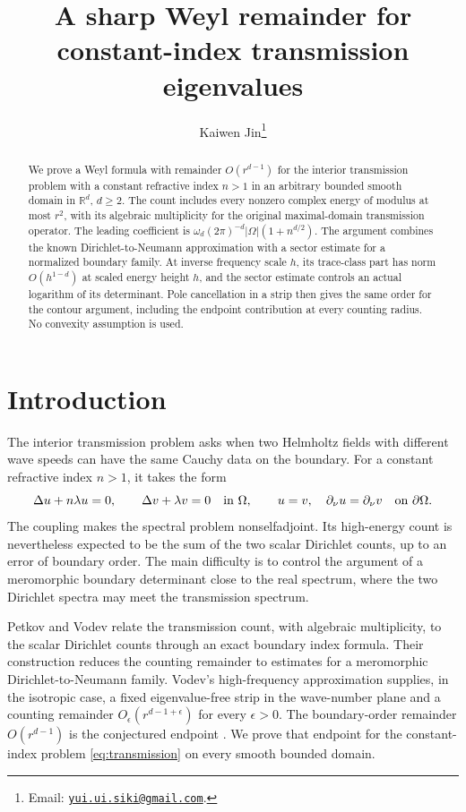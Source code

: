 \documentclass[11pt,a4paper]{article}
\title{A sharp Weyl remainder for constant-index transmission eigenvalues}
\author{Kaiwen Jin\thanks{Email: \href{mailto:yui.ui.siki@gmail.com}{\texttt{yui.ui.siki@gmail.com}}.}}
\date{}
\theoremstyle{remark}
\numberwithin{equation}{section}
\begin{document}
\maketitle
\begin{abstract}
We prove a Weyl formula with remainder $O(r^{d-1})$ for the interior
transmission problem with a constant refractive index $n>1$ in an arbitrary
bounded smooth domain in $\mathbb R^d$, $d\ge2$. The count includes every
nonzero complex energy of modulus at most $r^2$, with its algebraic
multiplicity for the original maximal-domain transmission operator.
The leading coefficient is
$\omega_d(2\pi)^{-d}|\Omega|(1+n^{d/2})$.
The argument combines the known Dirichlet-to-Neumann approximation with a
sector estimate for a normalized boundary family. At inverse frequency scale $h$, its trace-class part
has norm $O(h^{1-d})$ at scaled energy height $h$, and the sector estimate controls an
actual logarithm of its determinant. Pole cancellation in a strip then
gives the same order for the contour argument, including the endpoint
contribution at every counting radius. No convexity assumption is used.
\end{abstract}

\section{Introduction}

The interior transmission problem asks when two Helmholtz fields with
different wave speeds can have the same Cauchy data on the boundary.
For a constant refractive index $n>1$, it takes the form
\begin{equation}\label{eq:transmission}
 \Delta u+n\lambda u=0,\qquad \Delta v+\lambda v=0
 \quad\hbox{in }\Omega,\qquad
 u=v,\quad \partial_\nu u=\partial_\nu v
 \quad\hbox{on }\partial\Omega.
\end{equation}
The coupling makes the spectral problem nonselfadjoint. Its high-energy
count is nevertheless expected to be the sum of the two scalar
Dirichlet counts, up to an error of boundary order. The main difficulty
is to control the argument of a meromorphic boundary determinant close
to the real spectrum, where the two Dirichlet spectra may meet the
transmission spectrum.

Petkov and Vodev \cite{PV} relate the transmission count, with algebraic
multiplicity, to the scalar Dirichlet counts through an exact boundary
index formula. Their construction reduces the counting remainder to
estimates for a meromorphic Dirichlet-to-Neumann family. Vodev's
high-frequency approximation \cite{Vdn} supplies, in the isotropic case,
a fixed eigenvalue-free strip in the wave-number plane and a counting
remainder $O_\epsilon(r^{d-1+\epsilon})$ for every $\epsilon>0$.
The boundary-order remainder $O(r^{d-1})$ is the conjectured endpoint
\cite[Section~7, Conjecture~1, (19)]{Vsurvey}. We prove that endpoint
for the constant-index problem \eqref{eq:transmission} on every smooth
bounded domain.
\end{document}
